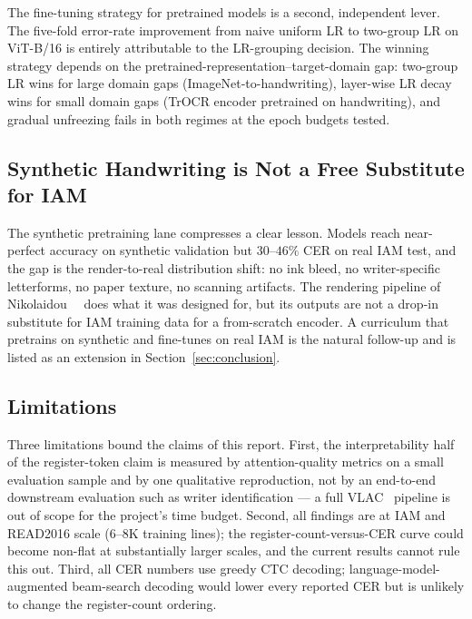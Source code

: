 The fine-tuning strategy for pretrained models is a second, independent lever. The five-fold error-rate improvement from naive uniform LR to two-group LR on ViT-B/16 is entirely attributable to the LR-grouping decision. The winning strategy depends on the pretrained-representation--target-domain gap: two-group LR wins for large domain gaps (ImageNet-to-handwriting), layer-wise LR decay wins for small domain gaps (TrOCR encoder pretrained on handwriting), and gradual unfreezing fails in both regimes at the epoch budgets tested.

\subsection{Synthetic Handwriting is Not a Free Substitute for IAM}
\label{sec:disc_synth}

The synthetic pretraining lane compresses a clear lesson. Models reach near-perfect accuracy on synthetic validation but $30$--$46\%$ CER on real IAM test, and the gap is the render-to-real distribution shift: no ink bleed, no writer-specific letterforms, no paper texture, no scanning artifacts. The rendering pipeline of Nikolaidou~\etal~\cite{nikolaidou2023wordstylist} does what it was designed for, but its outputs are not a drop-in substitute for IAM training data for a from-scratch encoder. A curriculum that pretrains on synthetic and fine-tunes on real IAM is the natural follow-up and is listed as an extension in Section~\ref{sec:conclusion}.

\subsection{Limitations}
\label{sec:disc_limits}

Three limitations bound the claims of this report. First, the interpretability half of the register-token claim is measured by attention-quality metrics on a small evaluation sample and by one qualitative reproduction, not by an end-to-end downstream evaluation such as writer identification --- a full VLAC~\cite{souibgui2022vlac} pipeline is out of scope for the project's time budget. Second, all findings are at IAM and READ2016 scale ($6$--$8$K training lines); the register-count-versus-CER curve could become non-flat at substantially larger scales, and the current results cannot rule this out. Third, all CER numbers use greedy CTC decoding; language-model-augmented beam-search decoding would lower every reported CER but is unlikely to change the register-count ordering.
